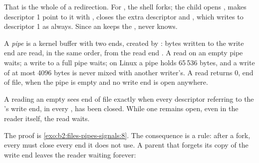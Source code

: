 That is the whole of a redirection. For , the shell forks; the child opens
, makes descriptor 1 point to it with , closes the extra descriptor and  ,
which writes to descriptor 1 as always. Since an  keeps the ,  never knows.



\begin{definition}[Pipe]\label{def:b2:files-pipes-signals:pipe}
A \emph{pipe} is a kernel buffer with two ends, created by : bytes written to the write
end  are read, in the same order, from the read end . A read on an empty pipe waits; a write
to a full pipe waits; on Linux a pipe holds 65\,536 bytes, and a write of at most 4096 bytes is never mixed with
another writer's. A read returns 0, end of file, when the pipe is empty and no write end is open anywhere.
\end{definition}

\begin{proposition}\label{prop:b2:files-pipes-signals:eof}
A  reading an empty  sees end of file exactly when every descriptor referring to the 's write end, in
every , has been closed. While one remains open, even in the reader itself, the read waits.
\end{proposition}

The proof is \cref{exo:b2:files-pipes-signals:8}. The consequence is a rule: after a fork, every  must close
every  end it does not use. A parent that forgets its copy of the write end leaves the reader waiting forever:



